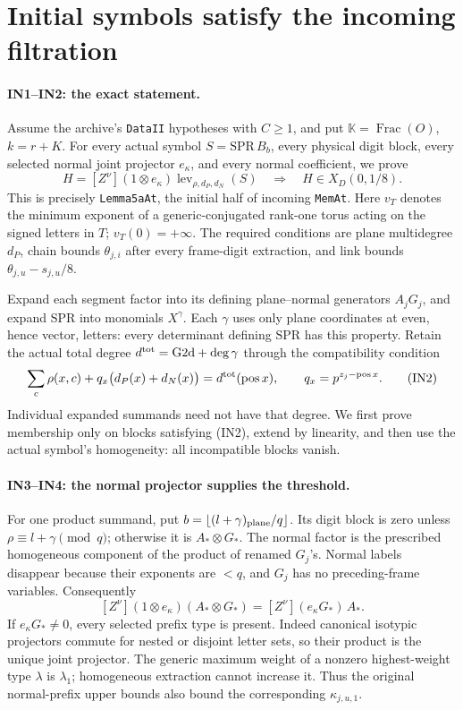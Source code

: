 \documentclass[11pt,a4paper]{article}
\numberwithin{equation}{section}
\theoremstyle{remark}\newtheorem{remark}[theorem]{Remark}
\begin{document}
\section{Initial symbols satisfy the incoming filtration}
\label{sec:initial-membership}

\paragraph{IN1--IN2: the exact statement.}\cite{initial-blocks}
Assume the archive's \texttt{DataII} hypotheses with $C\geq1$, and put
$\mathbb K=\operatorname{Frac}(O)$, $k=r+K$.  For every actual symbol
$S=\mathrm{SPR}\,B_b$, every physical digit block, every selected normal
joint projector $e_\kappa$, and every normal coefficient, we prove
\[
 H=[Z^\nu](1\otimes e_\kappa)\operatorname{lev}_{\rho,d_P,d_N}(S)
 \quad\Longrightarrow\quad H\in X_D(0,1/8).
 \tag{IN1}
\]
This is precisely \texttt{Lemma5aAt}, the initial half of incoming
\texttt{MemAt}.  Here $v_T$ denotes the minimum exponent of a
generic-conjugated rank-one torus acting on the signed letters in $T$;
$v_T(0)=+\infty$.  The required conditions are plane multidegree $d_P$,
chain bounds $\theta_{j,i}$ after every frame-digit extraction, and link
bounds $\theta_{j,u}-s_{j,u}/8$.

Expand each segment factor into its defining plane--normal generators
$A_jG_j$, and expand $\mathrm{SPR}$ into monomials $X^\gamma$.
Each $\gamma$ uses only plane coordinates at even, hence vector, letters:
every determinant defining $\mathrm{SPR}$ has this property.
Retain the actual total degree
$d^{\rm tot}=\mathrm{G2d}+\deg\gamma$ through the compatibility condition
\[
 \sum_c\rho(x,c)+q_x\bigl(d_P(x)+d_N(x)\bigr)
       =d^{\rm tot}(\operatorname{pos}x),
 \qquad q_x=p^{z_j-\operatorname{pos}x}.
 \tag{IN2}
\]
Individual expanded summands need not have that degree.  We first prove
membership only on blocks satisfying (IN2), extend by linearity, and
then use the actual symbol's homogeneity: all incompatible blocks vanish.

\paragraph{IN3--IN4: the normal projector supplies the threshold.}
For one product summand, put $b=\lfloor(l+\gamma)_{\rm plane}/q\rfloor$.
Its digit block is zero unless $\rho\equiv l+\gamma\pmod q$; otherwise it is
$A_*\otimes G_*$.  The normal factor is the prescribed homogeneous
component of the product of renamed $G_j$'s.  Normal labels disappear
because their exponents are $<q$, and $G_j$ has no preceding-frame variables.
Consequently
\[
 [Z^\nu](1\otimes e_\kappa)(A_*\otimes G_*)
             =[Z^\nu](e_\kappa G_*)\,A_*.
 \tag{IN3}
\]
If $e_\kappa G_*\neq0$, every selected prefix type is present.
Indeed canonical isotypic projectors commute for nested or disjoint
letter sets, so their product is the unique joint projector.
The generic maximum weight of a nonzero highest-weight type $\lambda$
is $\lambda_1$; homogeneous extraction cannot increase it.
Thus the original normal-prefix upper bounds also bound the corresponding
$\kappa_{j,u,1}$.
\end{document}
